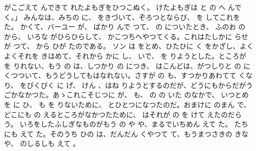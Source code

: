 \documentclass[a4paper,
tate,
book]
{jlreq}
\begin{document}
 がこごえて んできて
 れたよもぎをひつこぬく。
 けたよもぎは と
 の へ んで く。」
  みんなは、みちの に、 をきづいて、ぞろつとならび、 を してこれを た。
  かくて、バーユー が、 ばかり んで つて、 の についたとき、 ふのお の から、 いろな がひらひらして、 かこつちへやつてくる。これはたしかに らせが つて、 から ひが たのである。
  ソン は をとめ、ひたひに く をかざし、よくよくそれを きはめて、それから かに し、 いで、 を りようとした。ところが を りれない、もう の は、しつかり の につき、 はこんどは、がつしりと の にくつついて、もうどうしてもはなれない。さすが の も、すつかりあわてて くなり、 をびくびく に げ、  けん 、はね りようとするのだが、どうにもからだがうごかなかつた。あゝこれこそじつに が、 も、 の の いた のなかで、 いつとめを に ひ、 も を りないために、 とひとつになつたのだ。おまけに のまん で、どこにも の えるところがなかつたために、 はそれが の を けて えたのだらう。 いろをしたふしぎなものがもう の や や、まるでいちめん えて た。 たちにも えて た。そのうち ひの は、だんだん くやつて て、もうまつさきの きな や、 のしるしも えて 。
\end{document}

